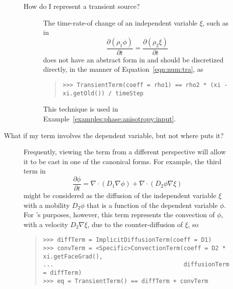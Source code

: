 \begin{description}
\begin{description}
\begin{description}
                \item[How do I represent a transient source?]
                    The time-rate-of change of an independent variable
                    $\xi$, such as in
                    \[
                        \frac{\partial (\rho_1 \phi)}{\partial t}
                        = \frac{\partial (\rho_2 \xi)}{\partial t}
                    \]
                    does not have an abstract form in \FiPy{} and
                    should be discretized directly, in the manner of
                    Equation~\eqref{eqn:num:tra}, as
                    \begin{quote}
\begin{verbatim}
>>> TransientTerm(coeff = rho1) == rho2 * (xi - xi.getOld()) / timeStep
\end{verbatim}
                    \end{quote}
                    This technique is used in
                    Example~\ref{examples:phase:anisotropy:input}.
                    
            \end{description}

            \item[What if my term involves the dependent variable, 
            but not where \FiPy{} puts it?]
            
            Frequently, viewing the term from a different perspective
            will allow it to be cast in one of the canonical forms.
            For example, the third term in
            \[
                \frac{\partial \phi}{\partial t} 
                = \nabla\cdot\left( D_1 \nabla \phi\right)
                + \nabla\cdot\left( D_2 \phi \nabla \xi\right)
            \]
            might be considered as the diffusion of the independent
            variable $\xi$ with a mobility $D_2\phi$ that is a
            function of the dependent variable $\phi$.  For \FiPy{}'s
            purposes, however, this term represents the convection of
            $\phi$, with a velocity $D_2\nabla\xi$, due to the
            counter-diffusion of $\xi$, so
            \begin{quote}
\begin{verbatim}
>>> diffTerm = ImplicitDiffusionTerm(coeff = D1)
>>> convTerm = <Specific>ConvectionTerm(coeff = D2 * xi.getFaceGrad(), 
...                                     diffusionTerm = diffTerm)
>>> eq = TransientTerm() == diffTerm + convTerm
\end{verbatim}


\end{quote}
\end{description}
\end{description}
